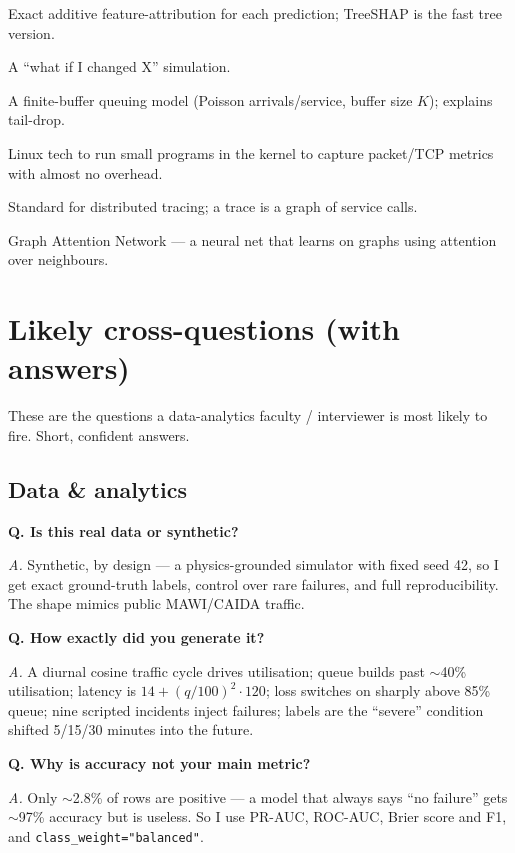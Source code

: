 \documentclass[11pt,a4paper]{article}
\newcommand{\Q}[1]{\vspace{4pt}\noindent\textbf{Q. #1}\par\nopagebreak}
\newcommand{\A}[1]{\noindent\textit{A.} #1\par}
\begin{document}
\begin{description}[leftmargin=0pt,style=nextline]
  \item[SHAP / TreeSHAP] Exact additive feature-attribution for each prediction; TreeSHAP is the fast tree version.
  \item[Counterfactual] A ``what if I changed X'' simulation.
  \item[M/M/1/K queue] A finite-buffer queuing model (Poisson arrivals/service, buffer size $K$); explains tail-drop.
  \item[eBPF / XDP] Linux tech to run small programs in the kernel to capture packet/TCP metrics with almost no overhead.
  \item[OpenTelemetry / span / trace / DAG] Standard for distributed tracing; a trace is a graph of service calls.
  \item[GAT] Graph Attention Network --- a neural net that learns on graphs using attention over neighbours.
\end{description}

\section{Likely cross-questions (with answers)}
These are the questions a data-analytics faculty / interviewer is most likely to fire. Short, confident answers.

\subsection{Data \& analytics}
\Q{Is this real data or synthetic?}
\A{Synthetic, by design --- a physics-grounded simulator with fixed seed 42, so I get exact ground-truth
labels, control over rare failures, and full reproducibility. The shape mimics public MAWI/CAIDA traffic.}

\Q{How exactly did you generate it?}
\A{A diurnal cosine traffic cycle drives utilisation; queue builds past $\sim$40\% utilisation; latency is
$14+(q/100)^2\cdot120$; loss switches on sharply above 85\% queue; nine scripted incidents inject failures;
labels are the ``severe'' condition shifted 5/15/30 minutes into the future.}

\Q{Why is accuracy not your main metric?}
\A{Only $\sim$2.8\% of rows are positive --- a model that always says ``no failure'' gets $\sim$97\% accuracy
but is useless. So I use PR-AUC, ROC-AUC, Brier score and F1, and \texttt{class\_weight="balanced"}.}
\end{document}
